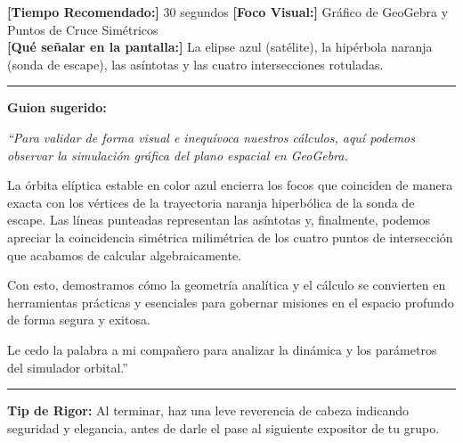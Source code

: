 \documentclass[12pt,letterpaper]{article}
\begin{document}
\begin{tcolorbox}[colframe=USSBlue, colback=white, title=\textbf{DIAPOSITIVA 27: Plano del Sistema Aeroespacial (Pág. 27)}, coltitle=white]
    \small
    \textbf{[Tiempo Recomendado:]} 30 segundos \hfill \textbf{[Foco Visual:]} Gráfico de GeoGebra y Puntos de Cruce Simétricos \\
    \textbf{[Qué señalar en la pantalla:]} La elipse azul (satélite), la hipérbola naranja (sonda de escape), las asíntotas y las cuatro intersecciones rotuladas.
    \hrule\vspace{0.2cm}
    \textbf{Guion sugerido:}
    \medskip
    
    {\itshape
    ``Para validar de forma visual e inequívoca nuestros cálculos, aquí podemos observar la simulación gráfica del plano espacial en GeoGebra. 
    
    La órbita elíptica estable en color azul encierra los focos que coinciden de manera exacta con los vértices de la trayectoria naranja hiperbólica de la sonda de escape. Las líneas punteadas representan las asíntotas y, finalmente, podemos apreciar la coincidencia simétrica milimétrica de los cuatro puntos de intersección que acabamos de calcular algebraicamente.
    
    Con esto, demostramos cómo la geometría analítica y el cálculo se convierten en herramientas prácticas y esenciales para gobernar misiones en el espacio profundo de forma segura y exitosa. 
    
    Le cedo la palabra a mi compañero para analizar la dinámica y los parámetros del simulador orbital.''}
    \vspace{0.2cm}\hrule\vspace{0.15cm}
    \textbf{Tip de Rigor:} Al terminar, haz una leve reverencia de cabeza indicando seguridad y elegancia, antes de darle el pase al siguiente expositor de tu grupo.
\end{tcolorbox}
\end{document}
